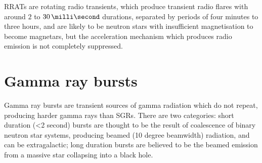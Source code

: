 RRATs are rotating radio transients, which produce transient radio
flares with around $2$ to $30\,\milli\second$ durations, separated by
periods of four minutes to three hours, and are likely to be neutron
stars with insufficient magnetisation to become magnetars, but the
acceleration mechanism which produces radio emission is not completely
suppressed.

\section{Gamma ray bursts}
\label{sec:gamma-ray-bursts}

Gamma ray bursts are transient sources of gamma radiation which do not
repeat, producing harder gamma rays than SGRs. There are two
categories: short duration (<2 second) bursts are thought to be the
result of coalescence of binary neutron star systems, producing beamed
(10 degree beamwidth) radiation, and can be extragalactic; long
duration bursts are believed to be the beamed emission from a massive
star collapsing into a black hole.

